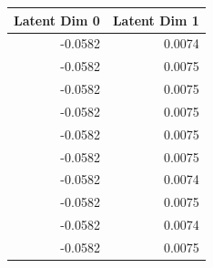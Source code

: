 \begin{tabular}{rr}
\toprule
Latent Dim 0 & Latent Dim 1 \\
\midrule
-0.0582 & 0.0074 \\
-0.0582 & 0.0075 \\
-0.0582 & 0.0075 \\
-0.0582 & 0.0075 \\
-0.0582 & 0.0075 \\
-0.0582 & 0.0075 \\
-0.0582 & 0.0074 \\
-0.0582 & 0.0075 \\
-0.0582 & 0.0074 \\
-0.0582 & 0.0075 \\
\bottomrule
\end{tabular}
